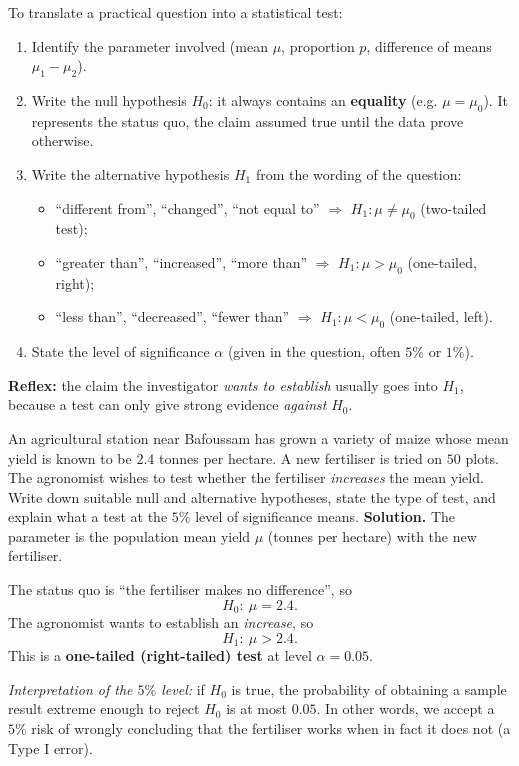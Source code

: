 \documentclass[11pt]{article}
\newcommand{\cle}[1]{{\popxbold\color{popdark}#1}}
\begin{document}
\begin{methode}
To translate a practical question into a statistical test:
\begin{enumerate}
\item Identify the \cle{parameter} involved (mean $\mu$, proportion $p$, difference of means $\mu_1-\mu_2$).
\item Write the \cle{null hypothesis} $H_0$: it always contains an \textbf{equality} (e.g. $\mu=\mu_0$). It represents the status quo, the claim assumed true until the data prove otherwise.
\item Write the \cle{alternative hypothesis} $H_1$ from the wording of the question:
\begin{itemize}
\item ``different from'', ``changed'', ``not equal to'' $\Rightarrow$ $H_1:\mu\neq\mu_0$ (\cle{two-tailed} test);
\item ``greater than'', ``increased'', ``more than'' $\Rightarrow$ $H_1:\mu>\mu_0$ (\cle{one-tailed, right});
\item ``less than'', ``decreased'', ``fewer than'' $\Rightarrow$ $H_1:\mu<\mu_0$ (\cle{one-tailed, left}).
\end{itemize}
\item State the \cle{level of significance} $\alpha$ (given in the question, often $5\%$ or $1\%$).
\end{enumerate}
\textbf{Reflex:} the claim the investigator \emph{wants to establish} usually goes into $H_1$, because a test can only give strong evidence \emph{against} $H_0$.
\end{methode}

\begin{exoresolu}
An agricultural station near Bafoussam has grown a variety of maize whose mean yield is known to be $2.4$ tonnes per hectare. A new fertiliser is tried on $50$ plots. The agronomist wishes to test whether the fertiliser \emph{increases} the mean yield. Write down suitable null and alternative hypotheses, state the type of test, and explain what a test at the $5\%$ level of significance means.
\tcblower
\textbf{Solution.} The parameter is the population mean yield $\mu$ (tonnes per hectare) with the new fertiliser.

The status quo is ``the fertiliser makes no difference'', so
\[ H_0:\ \mu = 2.4. \]
The agronomist wants to establish an \emph{increase}, so
\[ H_1:\ \mu > 2.4. \]
This is a \textbf{one-tailed (right-tailed) test} at level $\alpha = 0.05$.

\emph{Interpretation of the $5\%$ level:} if $H_0$ is true, the probability of obtaining a sample result extreme enough to reject $H_0$ is at most $0.05$. In other words, we accept a $5\%$ risk of wrongly concluding that the fertiliser works when in fact it does not (a Type I error).
\end{exoresolu}
\end{document}
